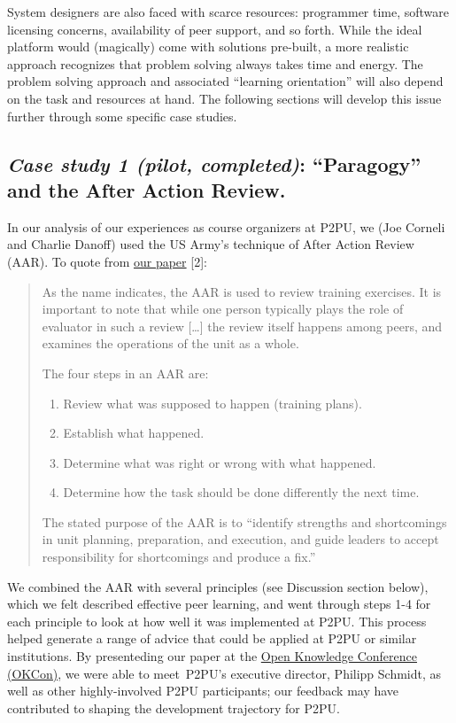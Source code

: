 System designers are also faced with scarce resources: programmer time,
software licensing concerns, availability of peer support, and so forth.
While the ideal platform would (magically) come with solutions
pre-built, a more realistic approach recognizes that problem solving
always takes time and energy. The problem solving approach and
associated ``learning orientation'' will also depend on the task and
resources at hand. The following sections will develop this issue
further through some specific case studies.

\subsection{\emph{Case study 1 (pilot, completed)}: ``Paragogy'' and the
After Action Review.}

In our analysis of our experiences as course organizers at P2PU, we (Joe
Corneli and Charlie Danoff) used the US Army's technique of After Action
Review (AAR). To quote from
\href{http://paragogy.net/ParagogyPaper2}{our paper} {[}2{]}:

\begin{quote}
As the name indicates, the AAR is used to review training exercises. It
is important to note that while one person typically plays the role of
evaluator in such a review {[}\ldots{}{]} the review itself happens
among peers, and examines the operations of the unit as a whole.

The four steps in an AAR are:

\begin{enumerate}
\item
  Review what was supposed to happen (training plans).
\item
  Establish what happened.
\item
  Determine what was right or wrong with what happened.
\item
  Determine how the task should be done differently the next time.
\end{enumerate}

The stated purpose of the AAR is to ``identify strengths and
shortcomings in unit planning, preparation, and execution, and guide
leaders to accept responsibility for shortcomings and produce a fix.''
\end{quote}

We combined the AAR with several principles (see Discussion section
below), which we felt described effective peer learning, and went
through steps 1-4 for each principle to look at how well it was
implemented at P2PU. This process helped generate a range of advice that
could be applied at P2PU or similar institutions. By presenteding our
paper at the \href{http://okfn.org/okcon/}{Open Knowledge Conference
(OKCon)}, we were able to meet~P2PU's executive director, Philipp
Schmidt, as well as other highly-involved P2PU participants; our
feedback may have contributed to shaping the development trajectory for
P2PU.

